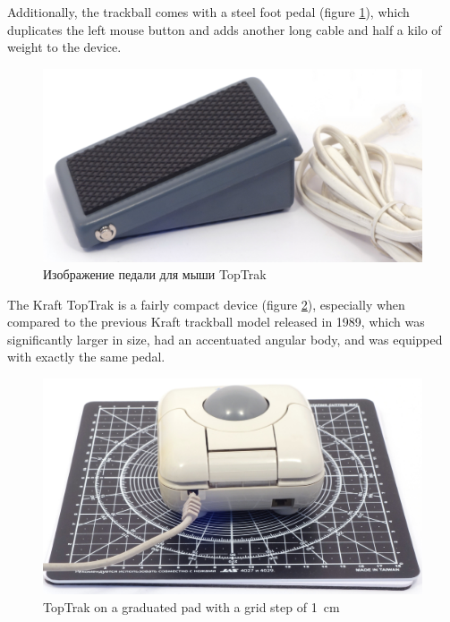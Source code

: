 \documentclass[11pt, a4paper]{article}
\begin{document}
Additionally, the trackball comes with a steel foot pedal (figure \ref{fig:TopTrakPedal}), which duplicates the left mouse button and adds another long cable and half a kilo of weight \cite{mouses} to the device.

\begin{figure}[h]
    \centering
    \includegraphics[scale=0.45]{1990_kraft_toptrack/pedal_30.jpg}
    \caption{Изображение педали для мыши TopTrak}
    \label{fig:TopTrakPedal}
\end{figure}


The Kraft TopTrak is a fairly compact device (figure \ref{fig:TopTrakSize}), especially when compared to the previous Kraft trackball model released in 1989, which was significantly larger in size, had an accentuated angular body, and was equipped with exactly the same pedal.

\begin{figure}[h]
    \centering
    \includegraphics[scale=0.35]{1990_kraft_toptrack/2.6_30.jpg}
    \caption{TopTrak on a graduated pad with a grid step of 1~cm}
    \label{fig:TopTrakSize}
\end{figure}
\end{document}
